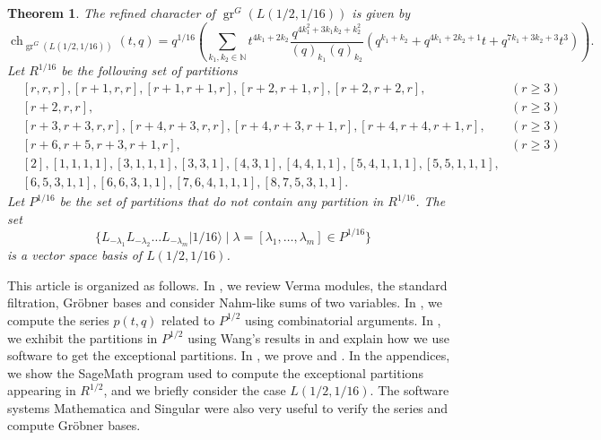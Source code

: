 \documentclass[a4paper, 12pt, reqno]{amsart}
\newtheorem{theorem}{Theorem}[section]
\theoremstyle{remark}
\DeclareMathOperator{\gr}{gr}
\DeclareMathOperator{\ch}{ch}
\newcommand{\vacsixteen}{{|1/16\rangle}}
\begin{document}
\begin{theorem}
  \label{thr:5}
  The refined character of $\gr^G(L(1/2, 1/16))$ is given by
  \begin{equation*}
    \ch_{\gr^G(L(1/2, 1/16))}(t, q) = q^{1/16}\left(\sum_{k_1, k_2 \in \mathbb{N}}t^{4k_1 + 2k_2}\frac{q^{4k_1^2 + 3k_1k_2 + k_2^2}}{(q)_{k_1}(q)_{k_2}}(q^{k_1 + k_2} + q^{4k_1 + 2k_2 + 1}t + q^{7k_1 + 3k_2 + 3}t^3)\right).
  \end{equation*}
  Let $R^{1/16}$ be the following set of partitions
  \begin{align*}
    &[r, r, r], [r + 1, r, r], [r + 1, r + 1, r], [r + 2, r + 1, r], [r + 2, r + 2, r], &(r \ge 3) \\
    &[r + 2, r, r], &(r \ge 3) \\
    &[r + 3, r + 3, r, r], [r + 4, r + 3, r, r],  [r + 4, r + 3, r + 1, r], [r + 4, r + 4, r + 1, r], &(r \ge 3)\\
    &[r + 6, r + 5, r + 3, r + 1, r], &(r \ge 3) \\
    &[2], [1, 1, 1, 1], [3, 1, 1, 1], [3, 3, 1], [4, 3, 1], [4, 4, 1, 1], [5, 4, 1, 1, 1], [5, 5, 1, 1, 1], \\
    &[6, 5, 3, 1, 1], [6, 6, 3, 1, 1], [7, 6, 4, 1, 1, 1], [8, 7, 5, 3, 1, 1].
  \end{align*}
  Let $P^{1/16}$ be the set of partitions that do not contain any partition in $R^{1/16}$.
  The set
  \begin{equation*}
    \{L_{-\lambda_1}L_{-\lambda_2}\dots L_{-\lambda_m}\vacsixteen \mid \lambda = [\lambda_1, \dots, \lambda_m] \in P^{1/16}\}
  \end{equation*}
  is a vector space basis of $L(1/2, 1/16)$.
\end{theorem}

This article is organized as follows.
In , we review Verma modules, the standard filtration, Gröbner bases and consider Nahm-like sums of two variables.
In , we compute the series $p(t, q)$ related to $P^{1/2}$ using combinatorial arguments.
In , we exhibit the partitions in $P^{1/2}$ using Wang's results in \cite{wang_rationality_1993} and explain how we use software to get the exceptional partitions.
In , we prove  and .
In the appendices, we show the SageMath \cite{sagemath} program used to compute the exceptional partitions appearing in $R^{1/2}$, and we briefly consider the case $L(1/2, 1/16)$.
The software systems Mathematica \cite{Mathematica} and Singular \cite{Singular} were also very useful to verify the series and compute Gröbner bases.
\end{document}
